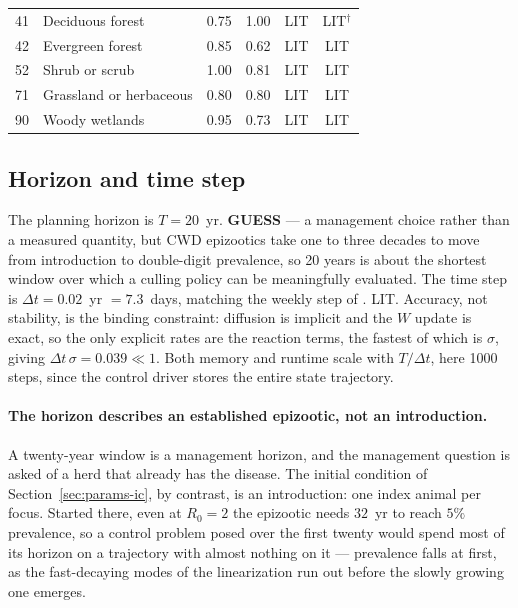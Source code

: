 \documentclass[11pt]{article}
\newcommand{\tagLIT}{{\footnotesize\textsf{\textcolor{green!40!black}{LIT}}}}
\newcommand{\tagGUESS}{{\footnotesize\textsf{\textbf{\textcolor{red!70!black}{GUESS}}}}}
\begin{document}
\begin{table}[h]
\begin{tabular}{@{}llcccc@{}}
41 & Deciduous forest             & 0.75 & 1.00 & \tagLIT{} & \tagLIT{}$^\dagger$ \\
42 & Evergreen forest             & 0.85 & 0.62 & \tagLIT{} & \tagLIT{} \\
52 & Shrub or scrub               & 1.00 & 0.81 & \tagLIT{} & \tagLIT{} \\
71 & Grassland or herbaceous      & 0.80 & 0.80 & \tagLIT{} & \tagLIT{} \\
90 & Woody wetlands               & 0.95 & 0.73 & \tagLIT{} & \tagLIT{} \\
\bottomrule
\end{tabular}
\end{table}

\subsection{Horizon and time step}
\label{sec:params-horizon}

The planning horizon is $T = 20$~yr. \tagGUESS{} --- a management choice rather than a measured quantity, but CWD epizootics take one to three decades to move from introduction to double-digit prevalence, so 20 years is about the shortest window over which a culling policy can be meaningfully evaluated. The time step is $\Delta t = 0.02$~yr $= 7.3$~days, matching the weekly step of \citet{Almberg2011}. \tagLIT{}. Accuracy, not stability, is the binding constraint: diffusion is implicit and the $W$ update is exact, so the only explicit rates are the reaction terms, the fastest of which is $\sigma$, giving $\Delta t\,\sigma = 0.039 \ll 1$. Both memory and runtime scale with $T/\Delta t$, here 1000 steps, since the control driver stores the entire state trajectory.

\paragraph{The horizon describes an established epizootic, not an introduction.} A twenty-year window is a management horizon, and the management question is asked of a herd that already has the disease. The initial condition of Section~\ref{sec:params-ic}, by contrast, is an introduction: one index animal per focus. Started there, even at $R_0 = 2$ the epizootic needs $32$~yr to reach $5\%$ prevalence, so a control problem posed over the first twenty would spend most of its horizon on a trajectory with almost nothing on it --- prevalence falls at first, as the fast-decaying modes of the linearization run out before the slowly growing one emerges.
\end{document}
